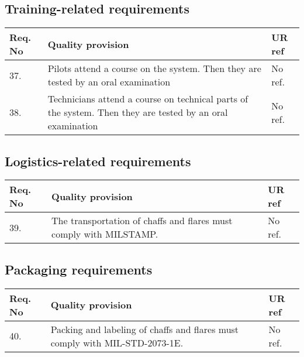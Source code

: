 \subsection{Training-related requirements}
\begin{center}
    \begin{tabular}{ | l | p{9cm} | l |}
    \hline
    Req. No & Quality provision  & UR ref \\ \hline
    37. & Pilots attend a course on the system. Then they are tested by an oral examination & No ref. \\ \hline
    38. & Technicians attend a course on technical parts of the system. Then they are tested by an oral examination & No ref. \\ \hline
    \end{tabular}
\end{center}

\subsection{Logistics-related requirements}
\begin{center}
    \begin{tabular}{ | l | p{9cm} | l |}
    \hline
    Req. No & Quality provision  & UR ref \\ \hline
    39. & The transportation of chaffs and flares must comply with MILSTAMP. & No ref. \\ \hline
    \end{tabular}
\end{center}

\subsection{Packaging requirements}
\begin{center}
    \begin{tabular}{ | l | p{9cm} | l |}
    \hline
    Req. No & Quality provision  & UR ref \\ \hline
    40. & Packing and labeling of chaffs and flares must comply with MIL-STD-2073-1E. & No ref. \\ \hline
    \end{tabular}
\end{center}
